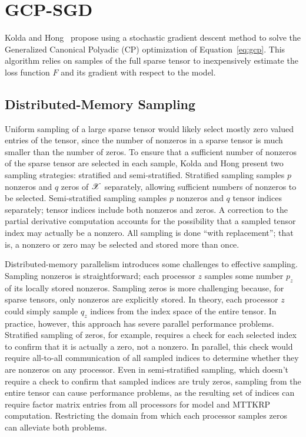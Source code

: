 
\chapter{GCP-SGD} \label{sec:gcp}

Kolda and Hong~\cite{KH19} propose using a stochastic gradient
descent method to solve the Generalized Canonical Polyadic (CP)
optimization of Equation~\ref{eq:gcp}.  This algorithm relies on samples
of the full sparse tensor to inexpensively estimate the loss function
$F$ and its gradient with respect to the model.

\section{Distributed-Memory Sampling} \label{sec:gcp_sample}

Uniform sampling of a large sparse tensor would likely select mostly zero
valued entries of the tensor, since the number of nonzeros in a sparse
tensor is much smaller than the number of zeros.
To ensure that a sufficient number of nonzeros of the sparse tensor are
selected in each sample, Kolda and Hong present
two sampling strategies:  stratified and semi-stratified.  
Stratified sampling samples $p$ nonzeros and $q$ zeros 
of $\X$ separately, allowing
sufficient numbers of nonzeros to be selected.  Semi-stratified sampling
samples $p$ nonzeros and $q$ tensor indices separately; 
tensor indices include both
nonzeros and zeros.  A correction to the partial derivative 
computation accounts
for the possibility that a sampled tensor index may actually be a nonzero.
All sampling is done ``with replacement''; that is, a nonzero or zero
may be selected and stored more than once.

Distributed-memory parallelism introduces some challenges to effective sampling.
Sampling nonzeros is straightforward; each processor $z$ samples some number 
$p_z$ of its locally stored nonzeros.
Sampling zeros is more challenging because, for sparse tensors, only 
nonzeros are explicitly stored.
In theory, each processor $z$ could simply sample $q_z$ 
indices from the index space of the entire tensor.  
In practice, however, this approach has severe parallel performance problems.
Stratified sampling of zeros, for example, 
requires a check for each selected index to
confirm that it is actually a zero, not a nonzero.
In parallel, this check would require all-to-all communication of all 
sampled indices to determine whether they are nonzeros on any processor.
Even in semi-stratified sampling, which doesn't require a check to 
confirm that sampled indices are truly zeros, sampling from the entire tensor
can cause performance problems, as the resulting set of indices can require
factor matrix entries from all processors for model and MTTKRP computation.
Restricting the domain from which each processor samples zeros can alleviate
both problems.

